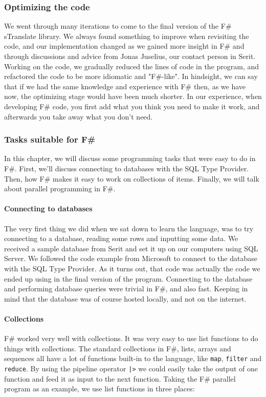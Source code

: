 \documentclass[12pt, a4paper]{article}
\newcommand{\code}[1]{{\small \texttt{#1}}}
\begin{document}
\subsubsection{Optimizing the code}
We went through many iterations to come to the final version of the F\# sTranslate library. We always found something to improve when revisiting the code, and our implementation changed as we gained more insight in F\# and through discussions and advice from Jonas Juselius, our contact person in Serit. Working on the code, we gradually reduced the lines of code in the program, and refactored the code to be more idiomatic and "F\#-like". In hindsight, we can say that if we had the same knowledge and experience with F\# then, as we have now, the optimizing stage would have been much shorter. In our experience, when developing F\# code, you first add what you think you need to make it work, and afterwards you take away what you don't need.

\subsubsection{Tasks suitable for F\#}
In this chapter, we will discuss some programming tasks that were easy to do in F\#. First, we'll discuss connecting to databases with the SQL Type Provider. Then, how F\# makes it easy to work on collections of items. Finally, we will talk about parallel programming in F\#.

\paragraph{Connecting to databases} The very first thing we did when we sat down to learn the language, was to try connecting to a database, reading some rows and inputting some data. We received a sample database from Serit and set it up on our computers using SQL Server. We followed the code example from Microsoft to connect to the database with the SQL Type Provider. As it turns out, that code was actually the code we ended up using in the final version of the program. Connecting to the database and performing database queries were trivial in F\#, and also fast. Keeping in mind that the database was of course hosted locally, and not on the internet.

\newpage
\paragraph{Collections} F\# worked very well with collections. It was very easy to use list functions to do things with collections. The standard collections in F\#, lists, arrays and sequences all have a lot of functions built-in to the language, like \code{map}, \code{filter} and \code{reduce}. By using the pipeline operator \code{|>} we could easily take the output of one function and feed it as input to the next function. Taking the F\# parallel program as an example, we use list functions in three places: 
\end{document}
